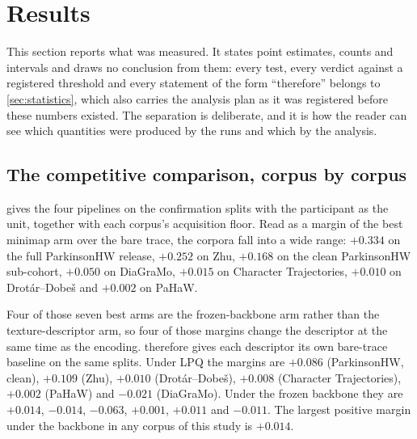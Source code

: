 
\section{Results}
\label{sec:results}

This section reports what was measured. It states point estimates, counts and intervals and draws
no conclusion from them: every test, every verdict against a registered threshold and every
statement of the form ``therefore'' belongs to \cref{sec:statistics}, which also carries the
analysis plan as it was registered before these numbers existed. The separation is deliberate, and
it is how the reader can see which quantities were produced by the runs and which by the analysis.

\subsection{The competitive comparison, corpus by corpus}
\label{sec:results-headline}

 gives the four pipelines on the confirmation splits with the participant as the
unit, together with each corpus's acquisition floor. Read as a margin of the best minimap arm over
the bare trace, the corpora fall into a wide range: $+0.334$ on the full ParkinsonHW release,
$+0.252$ on Zhu, $+0.168$ on the clean ParkinsonHW sub-cohort, $+0.050$ on DiaGraMo, $+0.015$ on
Character Trajectories, $+0.010$ on Drot\'ar--Dobe\v{s} and $+0.002$ on PaHaW.

Four of those seven best arms are the frozen-backbone arm rather than the texture-descriptor arm, so
four of those margins change the descriptor at the same time as the encoding.
 therefore gives each descriptor its own bare-trace baseline on the same splits.
Under LPQ the margins are $+0.086$ (ParkinsonHW, clean), $+0.109$ (Zhu), $+0.010$
(Drot\'ar--Dobe\v{s}), $+0.008$ (Character Trajectories), $+0.002$ (PaHaW) and $-0.021$ (DiaGraMo).
Under the frozen backbone they are $+0.014$, $-0.014$, $-0.063$, $+0.001$, $+0.011$ and $-0.011$.
The largest positive margin under the backbone in any corpus of this study is $+0.014$.

